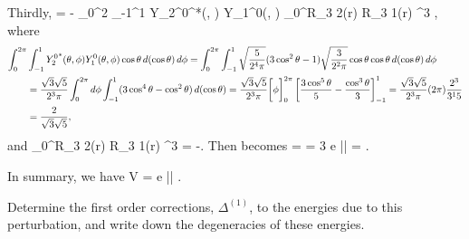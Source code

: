 \begin{solution}
	Thirdly,
	\beqn \label{v3}
		 = - \int_0^{2\pi} \int_{-1}^1 {Y_2^0}^*(\tht, \phi) Y_{1}^{0}(\tht, \phi) \cos\tht \dcost \dphi \int_0^\infty R_{3 2}(r) R_{3 1}(r) \rho^3 \drho,
	\eeqn
	where
	\begin{align*}
		\int_0^{2\pi} &\int_{-1}^1 {Y_2^0}^*(\theta, \phi) Y_{1}^{0}(\theta, \phi) \cos\theta \dd{(\cos\theta)} \dd{\phi}
		= \int_0^{2\pi} \int_{-1}^1 \sqrt{\frac{5}{2^4 \pi}} (3 \cos^2\theta - 1) \sqrt{\frac{3}{2^2 \pi}} \cos\theta \cos\theta \dd{(\cos\theta)} \dd{\phi} \\
		&= \frac{\sqrt{3} \sqrt{5}}{2^3 \pi} \int_0^{2\pi} \dd{\phi} \int_{-1}^1 (3 \cos^4\theta - \cos^2\theta) \dd{(\cos\theta)}
		= \frac{\sqrt{3} \sqrt{5}}{2^3 \pi} \bigg[ \phi \bigg]_0^{2\pi} \left[ \frac{3 \cos^5\theta}{5} - \frac{\cos^3\theta}{3} \right]_{-1}^1
		= \frac{\sqrt{3} \sqrt{5}}{2^3 \pi} (2\pi) \frac{2^3}{3^1 5} \\
		&= \frac{2}{\sqrt{3} \sqrt{5}},
	\end{align*}
	and
	\beq
		\int_0^\infty R_{3 2}(r) R_{3 1}(r) \rho^3 \drho = -.
	\eeq
	Then  becomes
	\beq
		 =   
		= 3  e |\vE| \ao
		= .
	\eeq
	
	In summary, we have
	\beqn \label{V2}
		V = e |\vE| \ao \!\!\! .
	\eeqn
\end{solution}


\newcommand{\Del}{\Delta^{(1)}}

\begin{problem}
	Determine the first order corrections, $\Del$, to the energies due to this perturbation, and write down the degeneracies of these energies.
\end{problem}

